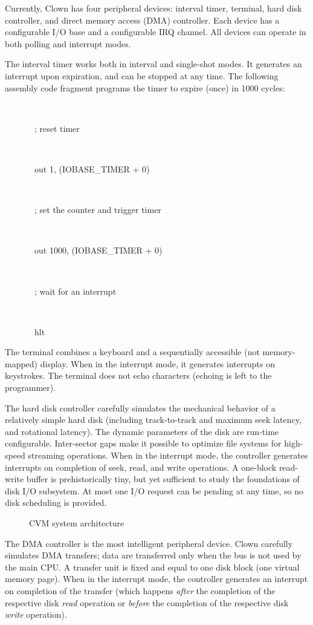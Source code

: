 \documentclass[10pt,twoside]{article}
\begin{document}
Currently, Clown has four peripheral devices: interval timer,
terminal, hard disk controller, and direct memory access (DMA)
controller. Each device has a configurable I/O base and a configurable
IRQ channel. All devices can operate in both polling and interrupt
modes.

The interval timer works both in interval and single-shot modes. It
generates an interrupt upon expiration, and can be stopped at any
time. The following assembly code fragment programs the timer to
expire (once) in 1000 cycles:

\baselineskip
{}\\
{\tt\strut\ \ \ \ \ \ \ ; reset timer}\\
{\tt\strut\ \ \ \ \ \ \ out 1, (IOBASE\_TIMER + 0)}\\
{\tt\strut\ \ \ \ \ \ \ ; set the counter and trigger timer}\\
{\tt\strut\ \ \ \ \ \ \ out 1000, (IOBASE\_TIMER + 0)}\\
{\tt\strut\ \ \ \ \ \ \ ; wait for an interrupt}\\
{\tt\strut\ \ \ \ \ \ \ hlt}
\baselineskip

The terminal combines a keyboard and a sequentially accessible (not
memory-mapped) display. When in the interrupt mode, it generates
interrupts on keystrokes. The terminal does not echo characters
(echoing is left to the programmer).

The hard disk controller carefully simulates the mechanical behavior
of a relatively simple hard disk (including track-to-track and maximum
seek latency, and rotational latency). The dynamic parameters of the
disk are run-time configurable. Inter-sector gaps make it possible to
optimize file systems for high-speed streaming operations. When in the
interrupt mode, the controller generates interrupts on completion of
seek, read, and write operations. A one-block read-write buffer is
prehistorically tiny, but yet sufficient to study the foundations of
disk I/O subsystem. At most one I/O request can be pending at any
time, so no disk scheduling is provided.

\begin{figure}[b!]\centering
{}
\caption{\label{ucvm}CVM system architecture}
\end{figure}

The DMA controller is the most intelligent peripheral device. Clown
carefully simulates DMA transfers; data are transferred only when the
bus is not used by the main CPU. A transfer unit is fixed and equal to
one disk block (one virtual memory page). When in the interrupt mode,
the controller generates an interrupt on completion of the transfer
(which happens {\em after} the completion of the respective disk {\em
read} operation or {\em before} the completion of the respective disk
{\em write} operation).
\end{document}
